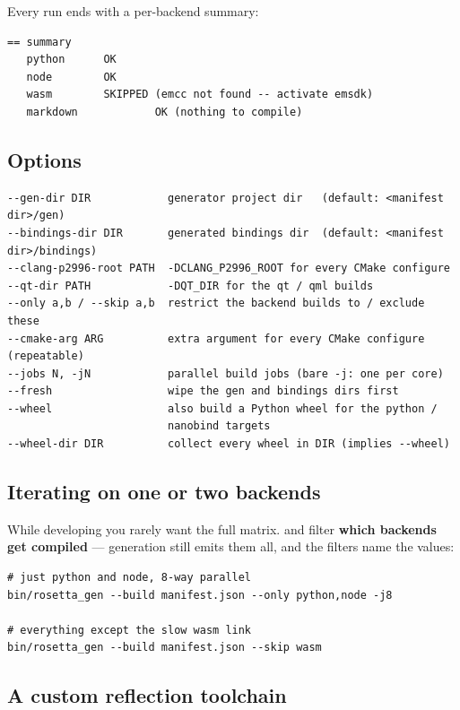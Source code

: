 Every run ends with a per-backend summary:

\begin{lstlisting}[style=plain]
== summary
   python      OK
   node        OK
   wasm        SKIPPED (emcc not found -- activate emsdk)
   markdown            OK (nothing to compile)
\end{lstlisting}

\subsection{Options}

\begin{lstlisting}[style=plain]
--gen-dir DIR            generator project dir   (default: <manifest dir>/gen)
--bindings-dir DIR       generated bindings dir  (default: <manifest dir>/bindings)
--clang-p2996-root PATH  -DCLANG_P2996_ROOT for every CMake configure
--qt-dir PATH            -DQT_DIR for the qt / qml builds
--only a,b / --skip a,b  restrict the backend builds to / exclude these
--cmake-arg ARG          extra argument for every CMake configure (repeatable)
--jobs N, -jN            parallel build jobs (bare -j: one per core)
--fresh                  wipe the gen and bindings dirs first
--wheel                  also build a Python wheel for the python /
                         nanobind targets
--wheel-dir DIR          collect every wheel in DIR (implies --wheel)
\end{lstlisting}

\subsection{Iterating on one or two backends}
\label{sec:onlyskip}

While developing you rarely want the full matrix.  and
 filter \textbf{which backends get compiled} --- generation still
emits them all, and the filters name the  values:

\begin{lstlisting}[style=sh]
# just python and node, 8-way parallel
bin/rosetta_gen --build manifest.json --only python,node -j8

# everything except the slow wasm link
bin/rosetta_gen --build manifest.json --skip wasm
\end{lstlisting}

\subsection{A custom reflection toolchain}

